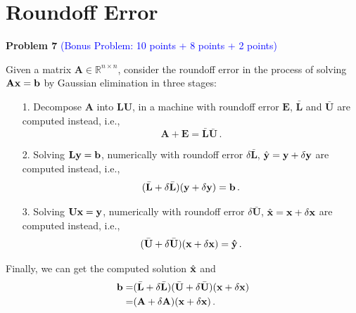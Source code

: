 \documentclass[english,onecolumn]{IEEEtran}
\begin{document}
\newpage

\section{Roundoff Error}
\noindent\textbf{Problem 7} \textcolor{blue}{(Bonus Problem: 10 points + 8 points + 2 points)}

Given a matrix $\mathbf{A}\in \mathbb{R}^{n\times n}$, consider the roundoff error in the process of solving $\mathbf{A}\bf{x} = \bf{b}$ by Gaussian elimination in three stages:
\begin{enumerate}
    \item[1.] Decompose $\mathbf{A}$ into $\mathbf{L}\mathbf{U}$, in a machine with roundoff error $\mathbf{E}$, $\bar{\mathbf{L}}$ and $\bar{\mathbf{U}}$ are computed instead, i.e., 
    \begin{equation*}
        \mathbf{A} + \mathbf{E} = \bar{\mathbf{L}}\bar{\mathbf{U}}\,.
    \end{equation*}
    \item[2.] Solving $\mathbf{L}\bf{y} = \bf{b}$, numerically with roundoff error $\delta \mathbf{\bar{L}}$, $\hat{\mathbf{y}} = \bf{y}+\delta \bf{y}$ are computed instead, i.e.,
    \begin{equation*}
        (\bar{\mathbf{L}}+\delta \bar{\mathbf{L}})(\bf{y}+\delta \bf{y}) = \bf{b}\,.
    \end{equation*}
    \item[3.] Solving $\mathbf{U}\bf{x} = \bf{y}$, numerically with roundoff error $\delta \mathbf{\bar{U}}$, $\hat{\bf{x}} = \bf{x}+\delta \bf{x}$ are computed instead, i.e.,
    \begin{equation*}
        (\bar{\mathbf{U}}+\delta \bar{\mathbf{U}})(\bf{x}+\delta \bf{x}) = \hat{y}\,.
    \end{equation*}
\end{enumerate}
Finally, we can get the computed solution $\hat{\bf{x}}$ and 
\begin{align*}
    \bf{b} = &(\bar{\mathbf{L}}+\delta \bar{\mathbf{L}})(\bar{\mathbf{U}}+\delta \bar{\mathbf{U}})(\bf{x}+\delta \bf{x})\\
     = & (\mathbf{A}+\delta \mathbf{A})(\bf{\bf{x}}+\delta \bf{\bf{x}})\,.
\end{align*}
\end{document}
